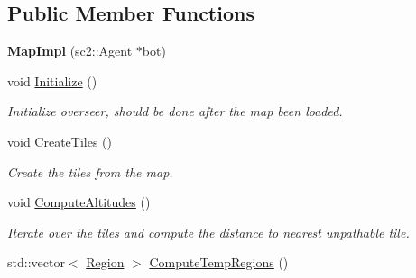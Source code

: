 \subsection*{Public Member Functions}
\begin{DoxyCompactItemize}
\item 
{\bfseries Map\+Impl} (sc2\+::\+Agent $\ast$bot)\hypertarget{classOverseer_1_1MapImpl_a9c30887c6f342971fabd54d23b36a765}{}\label{classOverseer_1_1MapImpl_a9c30887c6f342971fabd54d23b36a765}

\item 
void \hyperlink{classOverseer_1_1MapImpl_a5ec5b37d1ae07732a99845bfbbfce016}{Initialize} ()\hypertarget{classOverseer_1_1MapImpl_a5ec5b37d1ae07732a99845bfbbfce016}{}\label{classOverseer_1_1MapImpl_a5ec5b37d1ae07732a99845bfbbfce016}

\begin{DoxyCompactList}\small\item\em Initialize overseer, should be done after the map been loaded. \end{DoxyCompactList}\item 
void \hyperlink{classOverseer_1_1MapImpl_aab8edf3805bac97477dbf8bfb9cd71f8}{Create\+Tiles} ()\hypertarget{classOverseer_1_1MapImpl_aab8edf3805bac97477dbf8bfb9cd71f8}{}\label{classOverseer_1_1MapImpl_aab8edf3805bac97477dbf8bfb9cd71f8}

\begin{DoxyCompactList}\small\item\em Create the tiles from the map. \end{DoxyCompactList}\item 
void \hyperlink{classOverseer_1_1MapImpl_a9d27ace0ac8a0507437f398272f2c155}{Compute\+Altitudes} ()\hypertarget{classOverseer_1_1MapImpl_a9d27ace0ac8a0507437f398272f2c155}{}\label{classOverseer_1_1MapImpl_a9d27ace0ac8a0507437f398272f2c155}

\begin{DoxyCompactList}\small\item\em Iterate over the tiles and compute the distance to nearest unpathable tile. \end{DoxyCompactList}\item 
std\+::vector$<$ \hyperlink{classOverseer_1_1Region}{Region} $>$ \hyperlink{classOverseer_1_1MapImpl_a7e7b3b6d04816c9ce14220bccb37f3e2}{Compute\+Temp\+Regions} ()\hypertarget{classOverseer_1_1MapImpl_a7e7b3b6d04816c9ce14220bccb37f3e2}{}\label{classOverseer_1_1MapImpl_a7e7b3b6d04816c9ce14220bccb37f3e2}


\end{DoxyCompactItemize}
